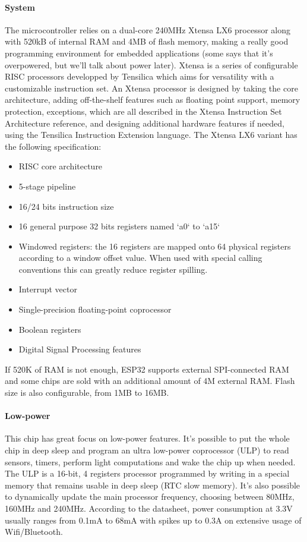 \documentclass[a4paper]{article}
\begin{document}
\paragraph{System} The microcontroller relies on a dual-core 240MHz Xtensa LX6 processor along with 520kB of internal RAM and 4MB of flash 
memory, making a really good programming environment for embedded applications (some says that it's overpowered, but we'll talk about power later). 
Xtensa is a series of configurable RISC processors developped by Tensilica which aims for versatility with a customizable instruction set. 
An Xtensa processor is designed by taking the core architecture, adding off-the-shelf features such as floating point support, memory protection, 
exceptions, which are all described in the Xtensa Instruction Set Architecture reference, and designing additional hardware features if needed, 
using the Tensilica Instruction Extension language. The Xtensa LX6 variant has the following specification:
\begin{itemize}[itemsep=0pt,parsep=0pt]
    \item RISC core architecture
    \item 5-stage pipeline
    \item 16/24 bits instruction size
    \item 16 general purpose 32 bits registers named `a0` to `a15`
    \item Windowed registers: the 16 registers are mapped onto 64 physical registers according to a window offset value. 
    When used with special calling conventions this can greatly reduce register spilling.
    \item Interrupt vector
    \item Single-precision floating-point coprocessor
    \item Boolean registers
    \item Digital Signal Processing features
\end{itemize}
If 520K of RAM is not enough, ESP32 supports external SPI-connected RAM and some chips are sold with an additional amount of 4M external RAM. 
Flash size is also configurable, from 1MB to 16MB. 
\paragraph{Low-power} This chip has great focus on low-power features. It's possible to put the whole chip in deep sleep and program an ultra 
low-power coprocessor (ULP) to read sensors, timers, perform light computations and wake the chip up when needed. 
The ULP is a 16-bit, 4 registers processor programmed by writing in a special memory that remains usable in deep sleep (RTC slow memory).
It's also possible to dynamically update the main processor frequency, choosing between 80MHz, 160MHz and 240MHz. According to the datasheet, power consumption at 3.3V usually ranges from 0.1mA to 68mA with spikes up to 0.3A on extensive usage of Wifi/Bluetooth.
\end{document}
